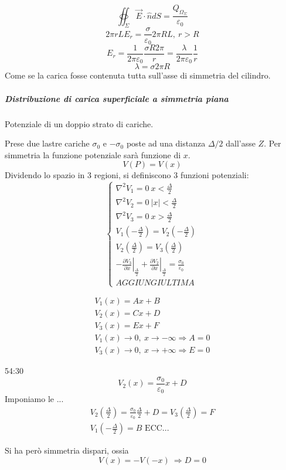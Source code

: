 $$
\oiint_\Sigma \vec{E}\cdot\hat{n}dS = \frac{Q_{\Omega_\Sigma}}{\varepsilon_0}
$$
$$
2 \pi r L E_r = \frac{\sigma}{\varepsilon_0} 2 \pi R L,\ r > R
$$
$$
E_r = \frac{1}{2 \pi \varepsilon_0} \frac{\sigma R 2 \pi}{r} = \frac{\lambda}{2\pi\varepsilon_0}\frac{1}{r}
$$
$$
\lambda = \sigma 2 \pi R
$$
Come se la carica fosse contenuta tutta sull'asse di simmetria del cilindro.


\subparagraph{Distribuzione di carica superficiale a simmetria piana}
Potenziale di un doppio strato di cariche.

Prese due lastre cariche $\sigma_0$ e $-\sigma_0$ poste ad una distanza $\Delta/2$ dall'asse $Z$.
Per simmetria la funzione potenziale sarà funzione di $x$.
$$
V(P) = V(x)
$$
Dividendo lo spazio in 3 regioni, si definiscono 3 funzioni potenziali:
$$
\begin{cases}
\nabla^2V_1 = 0\ x < \frac{\Delta}{2}\\
\nabla^2V_2 = 0\ |x| < \frac{\Delta}{2}\\
\nabla^2V_3 = 0\ x > \frac{\Delta}{2}\\
V_1(-\frac{\Delta}{2}) = V_2(-\frac{\Delta}{2}) \\
V_2(\frac{\Delta}{2}) = V_3(\frac{\Delta}{2}) \\
\left.-\frac{\partial V_3}{\partial x}\right|_{\frac{\Delta}{2}} + \left.\frac{\partial V_2}{\partial x}\right|_{\frac{\Delta}{2}} = \frac{\sigma_0}{\varepsilon_0} \\
AGGIUNGI ULTIMA
\end{cases}
$$

\begin{align*}
V_1(x) = Ax+B \\
V_2(x) = Cx+D \\
V_3(x) = Ex + F \\
V_1(x) \to 0, \ x\to -\infty \Rightarrow A = 0 \\
V_3(x) \to 0, \ x\to +\infty \Rightarrow E = 0 
\end{align*}

54:30
$$
V_2(x) = \frac{\sigma_0}{\varepsilon_0}x + D
$$
Imponiamo le ...
\begin{align*}
V_2(\frac{\Delta}{2}) = \frac{\sigma_0}{\varepsilon_0} \frac{\Delta}{2} + D = V_3(\frac{\Delta}{2}) = F\\
V_1(-\frac{\Delta}{2}) = B \text{ ECC...}
\end{align*}

Si ha però simmetria dispari, ossia 
$$
V(x) = - V(-x) \ \Rightarrow D = 0
$$

